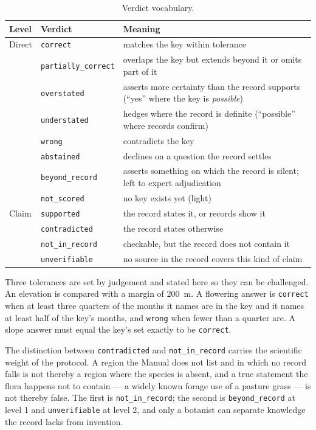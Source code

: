 \documentclass[11pt,a4paper]{article}
\newcommand{\vt}[1]{\texttt{#1}}          %
\begin{document}
\begin{table}[htbp]
\centering
\caption{Verdict vocabulary.}
\label{tab:verdicts}
\small
\begin{tabularx}{\textwidth}{llX}
\toprule
Level & Verdict & Meaning \\
\midrule
Direct & \vt{correct}            & matches the key within tolerance \\
       & \vt{partially\_correct} & overlaps the key but extends beyond it or omits part of it \\
       & \vt{overstated}         & asserts more certainty than the record supports (``yes'' where the key is \emph{possible}) \\
       & \vt{understated}        & hedges where the record is definite (``possible'' where records confirm) \\
       & \vt{wrong}              & contradicts the key \\
       & \vt{abstained}          & declines on a question the record settles \\
       & \vt{beyond\_record}     & asserts something on which the record is silent; left to expert adjudication \\
       & \vt{not\_scored}        & no key exists yet (light) \\
\midrule
Claim  & \vt{supported}          & the record states it, or records show it \\
       & \vt{contradicted}       & the record states otherwise \\
       & \vt{not\_in\_record}    & checkable, but the record does not contain it \\
       & \vt{unverifiable}       & no source in the record covers this kind of claim \\
\bottomrule
\end{tabularx}
\end{table}

Three tolerances are set by judgement and stated here so they can be challenged. An
elevation is compared with a margin of 200~m. A flowering answer is \vt{correct} when
at least three quarters of the months it names are in the key and it names at least
half of the key's months, and \vt{wrong} when fewer than a quarter are. A slope
answer must equal the key's set exactly to be \vt{correct}.

The distinction between \vt{contradicted} and \vt{not\_in\_record} carries the
scientific weight of the protocol. A region the Manual does not list and in which no
record falls is not thereby a region where the species is absent, and a true
statement the flora happens not to contain --- a widely known forage use of a pasture
grass --- is not thereby false. The first is \vt{not\_in\_record}; the second is
\vt{beyond\_record} at level 1 and \vt{unverifiable} at level 2, and only a botanist
can separate knowledge the record lacks from invention.
\end{document}
